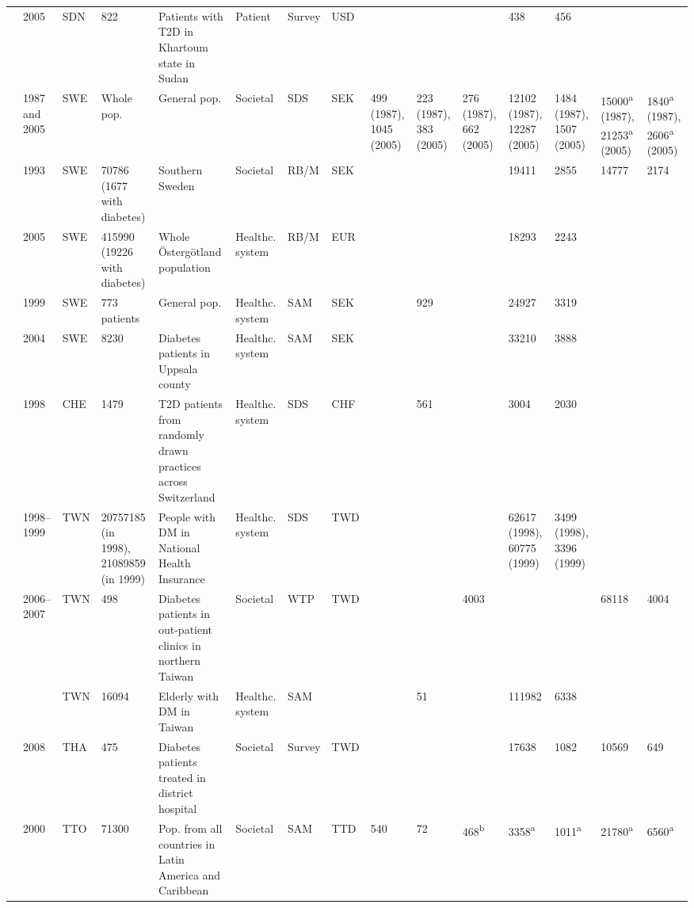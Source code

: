 \documentclass[12pt,english]{article}
\begin{document}
\begin{appendix}
\begin{landscape}
\begin{tabularx}{\linewidth}{Z X X Z Z X X X X X X X X Y Y}
\textcite{Elrayah-Eliadarous2010b} & 2005 & SDN & 822 & Patients with T2D in Khartoum state in   Sudan & Patient & Survey & USD &  &  &  & 438 & 456 &  &  \\
\textcite{Bolin2009d}  & 1987 and 2005 & SWE & Whole pop. & General pop. & Societal & SDS & SEK & 499 (1987), 1045 (2005) & 223 (1987), 383 (2005) & 276 (1987), 662 (2005) & 12102 (1987), 12287 (2005) & 1484 (1987), 1507 (2005) & 15000\textsuperscript{a}    (1987), 21253\textsuperscript{a}  (2005) & 1840\textsuperscript{a}    (1987), 2606\textsuperscript{a}  (2005) \\
\textcite{Norlund2001a} & 1993 & SWE & 70786 (1677 with diabetes) & Southern Sweden & Societal & RB/M & SEK &  &  &  & 19411 & 2855 & 14777 & 2174 \\
\textcite{Wirehn2008b} & 2005 & SWE & 415990 (19226 with diabetes) & Whole \"Osterg\"otland population & Healthc. system & RB/M & EUR &  &  &  & 18293 & 2243 &  &  \\
\textcite{Jonsson2002b} & 1999 & SWE & 773 patients & General pop. & Healthc. system & SAM & SEK &  & 929 &  & 24927 & 3319 &  &  \\
\textcite{Ringborg2008a} & 2004 & SWE & 8230 & Diabetes patients in Uppsala county & Healthc. system & SAM & SEK &  &  &  & 33210 & 3888 &  &  \\
\textcite{Schmitt-Koopmann2004b} & 1998 & CHE & 1479 & T2D patients from randomly drawn practices   across Switzerland & Healthc. system & SDS & CHF &  & 561 &  & 3004 & 2030 &  &  \\
\textcite{Lin2004} & 1998--1999 & TWN & 20757185 (in 1998), 21089859 (in 1999) & People with DM in National Health Insurance & Healthc. system & SDS & TWD &  &  &  & 62617 (1998), 60775 (1999) & 3499 (1998), 3396 (1999) &  &  \\
\textcite{Chang2010b} & 2006--2007 & TWN & 498 & Diabetes patients in out-patient clinics in   northern Taiwan & Societal & \ac{WTP} & TWD &  &  & 4003 &  &  & 68118 & 4004 \\
\textcite{Chi2011a} &  & TWN & 16094 & Elderly with DM in Taiwan & Healthc. system & SAM &  &  & 51 &  & 111982 & 6338 &  &  \\
\textcite{Chatterjee2011c} & 2008 & THA & 475 & Diabetes patients treated in district hospital & Societal & Survey & TWD &  &  &  & 17638 & 1082 & 10569 & 649 \\
\textcite{Barcelo2003} & 2000 & TTO & 71300 & Pop. from all countries in Latin America   and Caribbean & Societal & SAM & TTD & 540 & 72 & 468\textsuperscript{b} & 3358\textsuperscript{a} & 1011\textsuperscript{a} & 21780\textsuperscript{a} & 6560\textsuperscript{a} \\

\end{tabularx}
\end{landscape}
\end{appendix}
\end{document}
